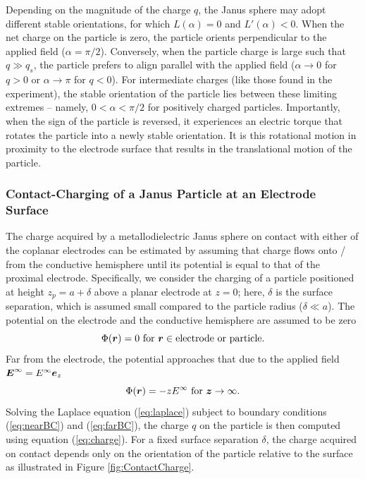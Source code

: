 \begin{appendices}
Depending on the magnitude of the charge $q$, the Janus sphere may adopt different stable orientations, for which $L(\alpha) = 0$ and $L'(\alpha) < 0$.  When the net charge on the particle is zero, the particle orients perpendicular to the applied field ($\alpha = \pi/2$). Conversely, when the particle charge is large such that $q\gg q_s$, the particle prefers to align parallel with the applied field ($\alpha \rightarrow 0$ for $q>0$ or $\alpha \rightarrow \pi$ for $q<0$). For intermediate charges (like those found in the experiment), the stable orientation of the particle lies between these limiting extremes -- namely, $0<\alpha<\pi/2$ for positively charged particles. Importantly, when the sign of the particle is reversed, it experiences an electric torque that rotates the particle into a newly stable orientation. It is this rotational motion in proximity to the electrode surface that results in the translational motion of the particle.


\subsubsection{Contact-Charging of a Janus Particle at an Electrode Surface}

The charge acquired by a metallodielectric Janus sphere on contact with either of the coplanar electrodes can be estimated by assuming that charge flows onto / from the conductive hemisphere until its potential is equal to that of the proximal electrode.
Specifically, we consider the charging of a particle positioned at height $z_p = a + \delta$ above a planar electrode at $z=0$; here, $\delta$ is the surface separation, which is assumed small compared to the particle radius ($\delta\ll a$).
The potential on the electrode and the conductive hemisphere are assumed to be zero
\begin{equation}
    \Phi(\boldsymbol{r}) = 0 \text{ for } \boldsymbol{r} \in \text{electrode or particle}. \label{eq:nearBC}
\end{equation}
Far from the electrode, the potential approaches that due to the applied field $\boldsymbol{E}^{\infty}=E^{\infty}\boldsymbol{e}_z$
\begin{equation}
    \Phi(\boldsymbol{r}) = -z E^{\infty} \text{ for } \boldsymbol{z} \rightarrow \infty. \label{eq:farBC}
\end{equation}
Solving the Laplace equation (\ref{eq:laplace}) subject to boundary conditions (\ref{eq:nearBC}) and (\ref{eq:farBC}), the charge $q$ on the particle is then computed using equation (\ref{eq:charge}).
For a fixed surface separation $\delta$, the charge acquired on contact depends only on the orientation of the particle relative to the surface as illustrated in Figure \ref{fig:ContactCharge}.


\end{appendices}
